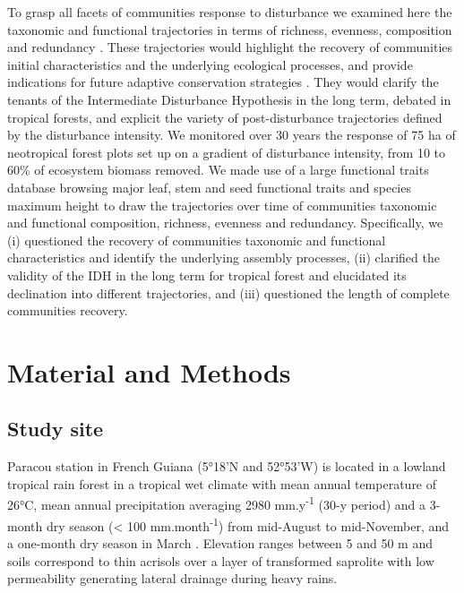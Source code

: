 \documentclass[fleqn,10pt]{ArtEcoFoG} %
\theoremstyle{definition}
\theoremstyle{definition}
\theoremstyle{definition}
\theoremstyle{remark}
\begin{document}
To grasp all facets of communities response to disturbance we examined
here the taxonomic and functional trajectories in terms of richness,
evenness, composition and redundancy
\citep{Lohbeck2015, Guariguata2001}. These trajectories would highlight
the recovery of communities initial characteristics and the underlying
ecological processes, and provide indications for future adaptive
conservation strategies \citep{Adler2007}. They would clarify the
tenants of the Intermediate Disturbance Hypothesis in the long term,
debated in tropical forests, and explicit the variety of
post-disturbance trajectories defined by the disturbance intensity. We
monitored over 30 years the response of 75 ha of neotropical forest
plots set up on a gradient of disturbance intensity, from 10 to 60\% of
ecosystem biomass removed. We made use of a large functional traits
database browsing major leaf, stem and seed functional traits and
species maximum height to draw the trajectories over time of communities
taxonomic and functional composition, richness, evenness and redundancy.
Specifically, we (i) questioned the recovery of communities taxonomic
and functional characteristics and identify the underlying assembly
processes, (ii) clarified the validity of the IDH in the long term for
tropical forest and elucidated its declination into different
trajectories, and (iii) questioned the length of complete communities
recovery.

\section{Material and Methods}\label{material-and-methods}

\subsection{Study site}\label{study-site}

Paracou station in French Guiana (5°18'N and 52°53'W) is located in a
lowland tropical rain forest in a tropical wet climate with mean annual
temperature of 26°C, mean annual precipitation averaging 2980
mm.y\textsuperscript{-1} (30-y period) and a 3-month dry season
(\textless{} 100 mm.month\textsuperscript{-1}) from mid-August to
mid-November, and a one-month dry season in March \citep{Wagner2011}.
Elevation ranges between 5 and 50 m and soils correspond to thin
acrisols over a layer of transformed saprolite with low permeability
generating lateral drainage during heavy rains.
\end{document}
